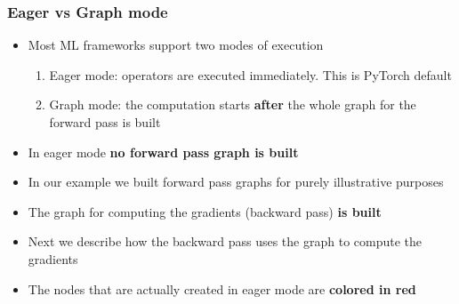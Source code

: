 \documentclass{beamer}
\theoremstyle{plain} %
\theoremstyle{example} %
\begin{document}
    

   
    






\begin{frame}
    \frametitle{Eager vs Graph mode}
\begin{itemize}
    \item Most ML frameworks support two modes of execution
    \begin{enumerate}
        \item Eager mode: operators are executed immediately. This is PyTorch default
        \item Graph mode: the computation starts \textbf{after} the whole  graph for the forward pass is built 
    \end{enumerate}
    \item In eager mode \textbf{no forward pass graph is built}
    \item In our example we built forward pass graphs for purely  illustrative purposes
    \item The graph for computing the gradients (backward pass) \textbf{is built}
    \item Next we describe how the backward pass uses the graph to compute the gradients
    \item The nodes that are actually created in eager mode are \textbf{colored in red}
\end{itemize}
    

\end{frame}
\end{document}
